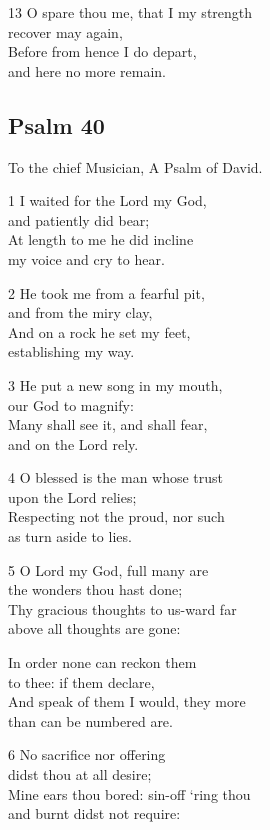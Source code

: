 \begin{multicols}{3}
13 O spare thou me, that I my strength\\
recover may again,\\
Before from hence I do depart,\\
and here no more remain.

\begin{center}
\quad{}\quad{}
\end{center}

\subsection*{Psalm 40}

To the chief Musician,
A Psalm of David.

1 I waited for the Lord my God,\\
and patiently did bear;\\
At length to me he did incline\\
my voice and cry to hear.

2 He took me from a fearful pit,\\
and from the miry clay,\\
And on a rock he set my feet,\\
establishing my way.

3 He put a new song in my mouth,\\
our God to magnify:\\
Many shall see it, and shall fear,\\
and on the Lord rely.

4 O blessed is the man whose trust\\
upon the Lord relies;\\
Respecting not the proud, nor such\\
as turn aside to lies.

5 O Lord my God, full many are\\
the wonders thou hast done;\\
Thy gracious thoughts to us-ward far\\
above all thoughts are gone:

In order none can reckon them\\
to thee: if them declare,\\
And speak of them I would, they more\\
than can be numbered are.

6 No sacrifice nor offering\\
didst thou at all desire;\\
Mine ears thou bored: sin-off ‘ring thou\\
and burnt didst not require:


\end{multicols}

